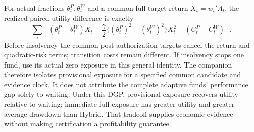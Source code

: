 

For actual fractions $\theta_t^P,\theta_t^W$ and a common full-target return
$X_t=w_t'A_t$, the realized paired utility difference is exactly
\[
 \sum_t\left[(\theta_t^P-\theta_t^W)X_t
 -\frac{\gamma}{2}\{(\theta_t^P)^2-(\theta_t^W)^2\}X_t^2
 -(C_t^P-C_t^W)\right].
\]
Before insolvency the common post-authorization targets cancel the return
and quadratic-risk terms; transition costs remain different. If insolvency
stops one fund, use its actual zero exposure in this general identity.
The companion therefore isolates provisional exposure for a specified common
candidate and evidence clock. It does not attribute the complete adaptive
funds' performance gap solely to waiting. Under this DGP, provisional exposure
recovers utility relative to waiting; immediate full exposure has greater
utility and greater average drawdown than Hybrid. That tradeoff supplies
economic evidence without making certification a profitability guarantee.
